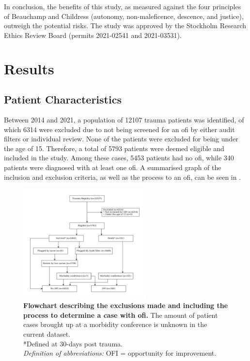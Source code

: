 \documentclass[12pt, a4paper]{article}
\begin{document}
In conclusion, the benefits of this study, as measured against the four principles of Beauchamp and Childress (autonomy, non-maleficence, descence, and justice), outweigh the potential risks. The study was approved by the Stockholm Research Ethics Review Board (permits 2021-02541 and 2021-03531).

\section{Results}
\subsection{Patient Characteristics}

Between 2014 and 2021, a population of \num{12107} trauma patients was identified, of which \num{6314} were excluded due to not being screened for an \acrshort{ofi} by either audit filters or individual review. None of the patients were excluded for being under the age of 15. Therefore, a total of \num{5793} patients were deemed eligible and included in the study. Among these cases, \num{5453} patients had no \acrshort{ofi}, while \num{340} patients were diagnosed with at least one \acrshort{ofi}. A summarised graph of the inclusion and exclusion criteria, as well as the process to an \acrshort{ofi}, can be seen in .

\begin{figure}
    \centering
    \includegraphics[width=0.6\textwidth]{figures/flowchart.pdf}
    \caption{\textbf{Flowchart describing the exclusions made and including the process to determine a case with \acrshort{ofi}.} The amount of patient cases brought up at a morbidity conference is unknown in the current dataset.\\
        *Defined at 30-days post trauma.\\
        \textit{Definition of abbreviations:} OFI = opportunity for improvement.}
    \label{fig:flowchart}
\end{figure}
\end{document}
